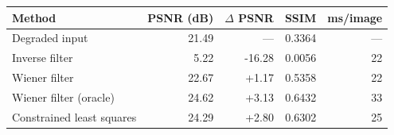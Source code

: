 \begin{tabular}{lrrrr}
\toprule
Method & PSNR (dB) & $\Delta$ PSNR & SSIM & ms/image \\
\midrule
Degraded input & 21.49 & --- & 0.3364 & --- \\
\midrule
Inverse filter & 5.22 & -16.28 & 0.0056 & 22 \\
Wiener filter & 22.67 & +1.17 & 0.5358 & 22 \\
Wiener filter (oracle) & 24.62 & +3.13 & 0.6432 & 33 \\
Constrained least squares & 24.29 & +2.80 & 0.6302 & 25 \\
\bottomrule
\end{tabular}
